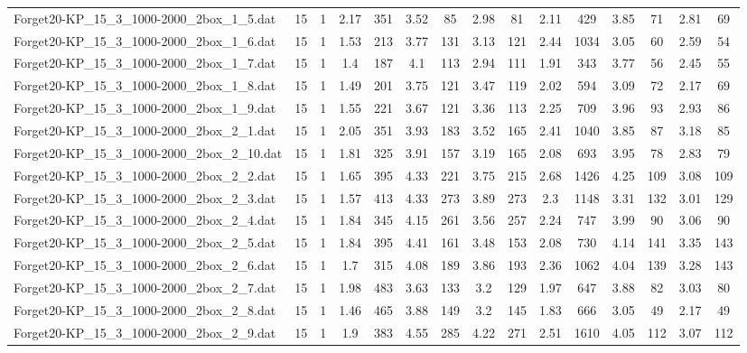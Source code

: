 \begin{table}[!ht]
{\begin{tabular}{lcccccccccccccc}
Forget20-KP\_15\_3\_1000-2000\_2box\_1\_5.dat & 15 & 1 & 2.17 & 351 & 3.52 & 85 & 2.98 & 81 & 2.11 & 429 & 3.85 & 71 & 2.81 & 69 \\
Forget20-KP\_15\_3\_1000-2000\_2box\_1\_6.dat & 15 & 1 & 1.53 & 213 & 3.77 & 131 & 3.13 & 121 & 2.44 & 1034 & 3.05 & 60 & 2.59 & 54 \\
Forget20-KP\_15\_3\_1000-2000\_2box\_1\_7.dat & 15 & 1 & 1.4 & 187 & 4.1 & 113 & 2.94 & 111 & 1.91 & 343 & 3.77 & 56 & 2.45 & 55 \\
Forget20-KP\_15\_3\_1000-2000\_2box\_1\_8.dat & 15 & 1 & 1.49 & 201 & 3.75 & 121 & 3.47 & 119 & 2.02 & 594 & 3.09 & 72 & 2.17 & 69 \\
Forget20-KP\_15\_3\_1000-2000\_2box\_1\_9.dat & 15 & 1 & 1.55 & 221 & 3.67 & 121 & 3.36 & 113 & 2.25 & 709 & 3.96 & 93 & 2.93 & 86 \\
Forget20-KP\_15\_3\_1000-2000\_2box\_2\_1.dat & 15 & 1 & 2.05 & 351 & 3.93 & 183 & 3.52 & 165 & 2.41 & 1040 & 3.85 & 87 & 3.18 & 85 \\
Forget20-KP\_15\_3\_1000-2000\_2box\_2\_10.dat & 15 & 1 & 1.81 & 325 & 3.91 & 157 & 3.19 & 165 & 2.08 & 693 & 3.95 & 78 & 2.83 & 79 \\
Forget20-KP\_15\_3\_1000-2000\_2box\_2\_2.dat & 15 & 1 & 1.65 & 395 & 4.33 & 221 & 3.75 & 215 & 2.68 & 1426 & 4.25 & 109 & 3.08 & 109 \\
Forget20-KP\_15\_3\_1000-2000\_2box\_2\_3.dat & 15 & 1 & 1.57 & 413 & 4.33 & 273 & 3.89 & 273 & 2.3 & 1148 & 3.31 & 132 & 3.01 & 129 \\
Forget20-KP\_15\_3\_1000-2000\_2box\_2\_4.dat & 15 & 1 & 1.84 & 345 & 4.15 & 261 & 3.56 & 257 & 2.24 & 747 & 3.99 & 90 & 3.06 & 90 \\
Forget20-KP\_15\_3\_1000-2000\_2box\_2\_5.dat & 15 & 1 & 1.84 & 395 & 4.41 & 161 & 3.48 & 153 & 2.08 & 730 & 4.14 & 141 & 3.35 & 143 \\
Forget20-KP\_15\_3\_1000-2000\_2box\_2\_6.dat & 15 & 1 & 1.7 & 315 & 4.08 & 189 & 3.86 & 193 & 2.36 & 1062 & 4.04 & 139 & 3.28 & 143 \\
Forget20-KP\_15\_3\_1000-2000\_2box\_2\_7.dat & 15 & 1 & 1.98 & 483 & 3.63 & 133 & 3.2 & 129 & 1.97 & 647 & 3.88 & 82 & 3.03 & 80 \\
Forget20-KP\_15\_3\_1000-2000\_2box\_2\_8.dat & 15 & 1 & 1.46 & 465 & 3.88 & 149 & 3.2 & 145 & 1.83 & 666 & 3.05 & 49 & 2.17 & 49 \\
Forget20-KP\_15\_3\_1000-2000\_2box\_2\_9.dat & 15 & 1 & 1.9 & 383 & 4.55 & 285 & 4.22 & 271 & 2.51 & 1610 & 4.05 & 112 & 3.07 & 112 \\

\end{tabular}}
\end{table}
